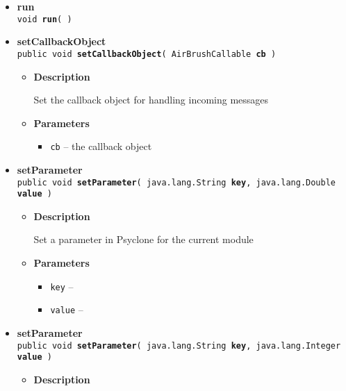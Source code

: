 {{{\begin{itemize}
{\begin{itemize}
{Post a message to Psyclone
}
\item{
{\bf Parameters}
  \begin{itemize}
   \item{
{\tt msg} -- }
  \end{itemize}
}%
\end{itemize}
}%
 \item{ 
{\bf run}\\
{\tt  void\ {\bf run}(  )
\label{amber.common.AirBrush.run()}}%
}%
 \item{ 
{\bf setCallbackObject}\\
{\tt public void\ {\bf setCallbackObject}( {\tt AirBrushCallable} {\bf cb} )
\label{amber.common.AirBrush.setCallbackObject(amber.common.AirBrushCallable)}}%
\begin{itemize}
\item{
{\bf Description}

Set the callback object for handling incoming messages
}
\item{
{\bf Parameters}
  \begin{itemize}
   \item{
{\tt cb} -- the callback object}
  \end{itemize}
}%
\end{itemize}
}%
 \item{ 
{\bf setParameter}\\
{\tt public void\ {\bf setParameter}( {\tt java.lang.String} {\bf key},
{\tt java.lang.Double} {\bf value} )
\label{amber.common.AirBrush.setParameter(java.lang.String, java.lang.Double)}}%
\begin{itemize}
\item{
{\bf Description}

Set a parameter in Psyclone for the current module
}
\item{
{\bf Parameters}
  \begin{itemize}
   \item{
{\tt key} -- }
   \item{
{\tt value} -- }
  \end{itemize}
}%
\end{itemize}
}%
 \item{ 
{\bf setParameter}\\
{\tt public void\ {\bf setParameter}( {\tt java.lang.String} {\bf key},
{\tt java.lang.Integer} {\bf value} )
\label{amber.common.AirBrush.setParameter(java.lang.String, java.lang.Integer)}}%
\begin{itemize}
\item{
{\bf Description}

}
\end{itemize}}
\end{itemize}}}}
